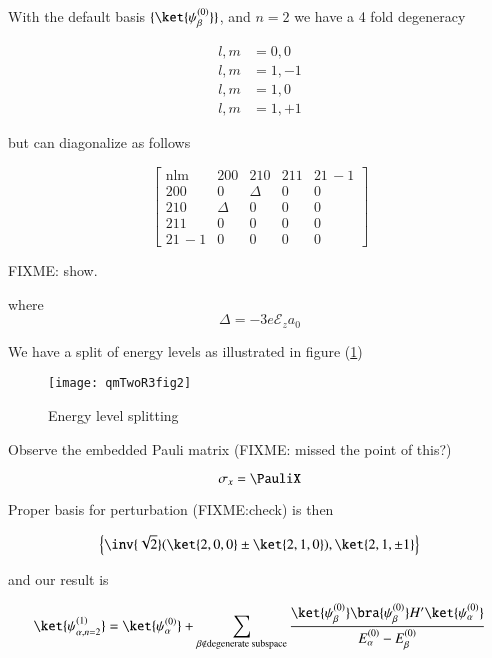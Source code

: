 With the default basis $\{\ket{\psi_\beta^{(0)}}\}$, and $n=2$ we have a 4 fold degeneracy

\begin{align*}
l,m &= 0,0 \\
l,m &= 1,-1 \\
l,m &= 1,0 \\
l,m &= 1,+1
\end{align*}

but can diagonalize as follows

\begin{equation}\label{eqn:qmTwoR3:570}
\begin{bmatrix}
\text{nlm} & 200 & 210 & 211 & 21\,-1 \\
200    & 0 & \Delta & 0 & 0 \\
210    & \Delta & 0 & 0 & 0 \\
211    & 0 & 0 & 0 & 0 \\
21\,-1 & 0 & 0 & 0 & 0
\end{bmatrix}
\end{equation}

FIXME: show.

where
\begin{equation}\label{eqn:qmTwoR3:590}
\Delta = -3 e \mathcal{E}_z a_0
\end{equation}

We have a split of energy levels as illustrated in figure (\ref{fig:qmTwoR3:qmTwoR3fig2})

\begin{figure}[htp]
   \centering
   \texttt{[image: qmTwoR3fig2]}
   \caption{Energy level splitting}\label{fig:qmTwoR3:qmTwoR3fig2}
\end{figure}

Observe the embedded Pauli matrix (FIXME: missed the point of this?)

\begin{equation}\label{eqn:qmTwoR3:330}
\sigma_x = \PauliX
\end{equation}

Proper basis for perturbation (FIXME:check) is then

\begin{equation}\label{eqn:qmTwoR3:350}
\left\{
\inv{\sqrt{2}}
( 
\ket{2,0,0} 
\pm 
\ket{2,1,0} 
), 
\ket{2, 1, \pm 1}
\right\}
\end{equation}

and our result is

\begin{equation}\label{eqn:qmTwoR3:370}
\ket{\psi_{\alpha, n=2}^{(1)}} = 
\ket{\psi_{\alpha}^{(0)}} 
+\sum_{\beta \notin \text{degenerate subspace}} \frac{ 
\ket{\psi_\beta^{(0)}} \bra{\psi_\beta^{(0)}} H' \ket{\psi_\alpha^{(0)}} 
}{
E_\alpha^{(0)} 
-E_\beta^{(0)} 
}
\end{equation}

